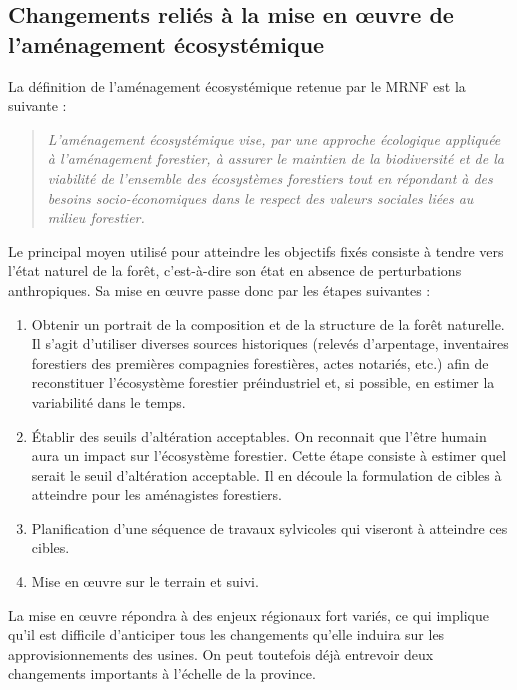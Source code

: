 %

\subsection{Changements reliés à la mise en œuvre de l'aménagement écosystémique}

La définition de l'aménagement écosystémique retenue par le MRNF est la suivante : 

\begin{quotation}\it
L'aménagement écosystémique vise, par une approche écologique appliquée à l'aménagement forestier, à assurer le maintien de la biodiversité et de la viabilité de l'ensemble des écosystèmes forestiers tout en répondant à des besoins socio-économiques dans le respect des valeurs sociales liées au milieu forestier.
\end{quotation}

Le principal moyen utilisé pour atteindre les objectifs fixés consiste à tendre vers l'état  \og naturel  \fg de la forêt, c'est-à-dire son état en absence de perturbations anthropiques. Sa mise en œuvre passe donc par les étapes suivantes :

\begin{enumerate}
\item Obtenir un portrait de la composition et de la structure de la forêt naturelle. Il s'agit d'utiliser diverses sources historiques (relevés d'arpentage, inventaires forestiers des premières compagnies forestières, actes notariés, etc.) afin de reconstituer l'écosystème forestier préindustriel et, si possible, en estimer la variabilité dans le temps.
\item Établir des seuils d'altération acceptables. On reconnait que l'être humain aura un impact sur l'écosystème forestier. Cette étape consiste à estimer quel serait le seuil d'altération acceptable. Il en découle la formulation de cibles à atteindre pour les aménagistes forestiers.
\item Planification d'une séquence de travaux sylvicoles qui viseront à atteindre ces cibles.
\item Mise en œuvre sur le terrain et suivi.

\end{enumerate}

La mise en œuvre répondra à des enjeux régionaux fort variés, ce qui implique qu'il est difficile d'anticiper tous les changements qu'elle induira sur les approvisionnements des usines. On peut toutefois déjà entrevoir deux changements importants à l'échelle de la province.\\

